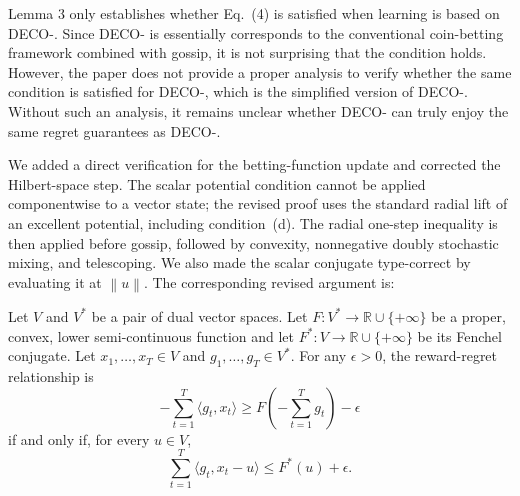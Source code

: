 \documentclass[12pt,english]{reviewresponse}
\newcommand{\norm}[1]{\left\lVert#1\right\rVert}
\newcommand{\algname}{{DECO}\xspace}
\begin{document}
\begin{revcomment}
    Lemma 3 only establishes whether Eq.~(4) is satisfied when learning is based on \algname{}-. Since \algname{}- is essentially corresponds to the conventional coin-betting framework combined with gossip, it is not surprising that the condition holds. However, the paper does not provide a proper analysis to verify whether the same condition is satisfied for \algname{}-, which is the simplified version of \algname{}-. Without such an analysis, it remains unclear whether \algname{}- can truly enjoy the same regret guarantees as \algname{}-.
\end{revcomment}
\begin{revresponse}
    We added a direct verification for the betting-function update and corrected the Hilbert-space step.  The scalar potential condition cannot be applied componentwise to a vector state; the revised proof uses the standard radial lift of an excellent potential, including condition~(d).  The radial one-step inequality is then applied before gossip, followed by convexity, nonnegative doubly stochastic mixing, and telescoping.  We also made the scalar conjugate type-correct by evaluating it at $\norm{u}$.
    The corresponding revised argument is:
    \begin{changes}
        Let $V$ and $V^*$ be a pair of dual vector spaces.
        Let $F:V^*\to\mathbb{R}\cup\{+\infty\}$ be a proper, convex, lower semi-continuous function and let $F^*:V\to\mathbb{R}\cup\{+\infty\}$ be its Fenchel conjugate.
        Let $x_1,\ldots,x_T\in V$ and $g_1,\ldots,g_T\in V^*$.
        For any $\epsilon>0$, the reward-regret relationship is
        \begin{equation*}
            -\sum_{t=1}^T\langle g_t,x_t\rangle
            \geq F\left(-\sum_{t=1}^T g_t\right)-\epsilon
        \end{equation*}
        if and only if, for every $u\in V$,
        \begin{equation*}
            \sum_{t=1}^T\langle g_t,x_t-u\rangle\leq F^*(u)+\epsilon.
        \end{equation*}


\end{changes}
\end{revresponse}
\end{document}
